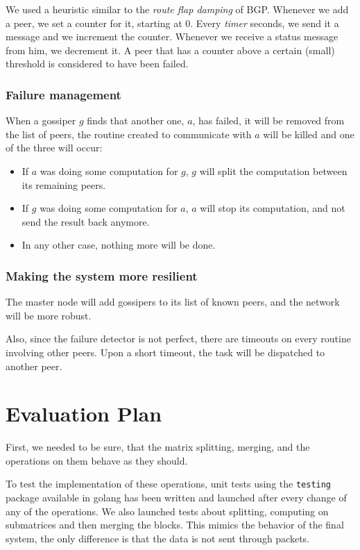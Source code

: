 \documentclass[a4paper,12pt]{article}
\begin{document}
    We used a heuristic similar to the \textit{route flap damping} of BGP. Whenever we add a peer, we set a counter for it, starting at 0. Every \textit{timer} seconds, we send it a message and we increment the counter. Whenever we receive a status message from him, we decrement it. A peer that has a counter above a certain (small) threshold is considered to have been failed.
    
    \subsubsection{Failure management}
    When a gossiper $g$ finds that another one, $a$, has failed, it will be removed from the list of peers, the routine created to communicate with $a$ will be killed and one of the three will occur:

\begin{itemize}
\item If $a$ was doing some computation for $g$, $g$ will split the computation between its remaining peers.
\item If $g$ was doing some computation for $a$, $a$ will stop its computation, and not send the result back anymore.
\item In any other case, nothing more will be done.
\end{itemize}

    \subsubsection{Making the system more resilient}
    The master node will add gossipers to its list of known peers, and the network will be more robust.
    
    Also, since the failure detector is not perfect, there are timeouts on every routine involving other peers. Upon a short timeout, the task will be dispatched to another peer.

    \section{Evaluation Plan}
    First, we needed to be sure, that the matrix splitting, merging, and the operations on them behave as they should.

    To test the implementation of these operations, unit tests using the \texttt{testing} package available in golang has been written and launched after every change of any of the operations. We also launched tests about splitting, computing on submatrices and then merging the blocks. This mimics the behavior of the final system, the only difference is that the data is not sent through packets.
\end{document}
